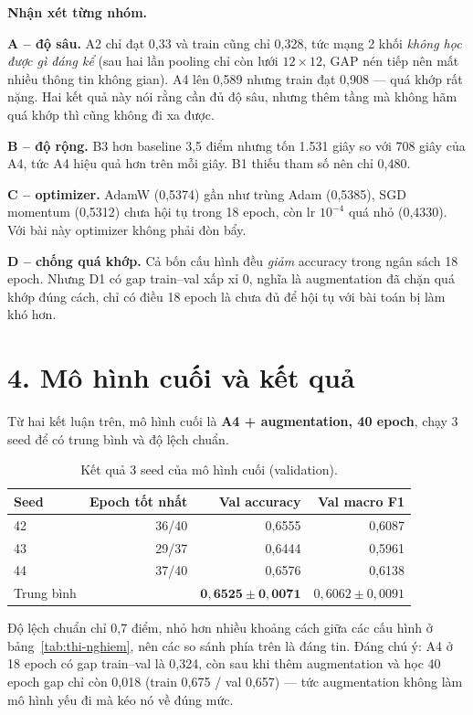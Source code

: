 \documentclass[a4paper,12pt]{article}
\begin{document}
\textbf{Nhận xét từng nhóm.}

\textbf{A -- độ sâu.} A2 chỉ đạt 0,33 và train cũng chỉ 0,328, tức mạng 2 khối \emph{không học
được gì đáng kể} (sau hai lần pooling chỉ còn lưới $12\times12$, GAP nén tiếp nên mất nhiều thông
tin không gian). A4 lên 0,589 nhưng train đạt 0,908 — quá khớp rất nặng. Hai kết quả này nói rằng
cần đủ độ sâu, nhưng thêm tầng mà không hãm quá khớp thì cũng không đi xa được.

\textbf{B -- độ rộng.} B3 hơn baseline 3,5 điểm nhưng tốn 1.531 giây so với 708 giây của A4, tức
A4 hiệu quả hơn trên mỗi giây. B1 thiếu tham số nên chỉ 0,480.

\textbf{C -- optimizer.} AdamW (0,5374) gần như trùng Adam (0,5385), SGD momentum (0,5312) chưa
hội tụ trong 18 epoch, còn lr $10^{-4}$ quá nhỏ (0,4330). Với bài này optimizer không phải đòn bẩy.

\textbf{D -- chống quá khớp.} Cả bốn cấu hình đều \emph{giảm} accuracy trong ngân sách 18 epoch.
Nhưng D1 có gap train--val xấp xỉ 0, nghĩa là augmentation đã chặn quá khớp đúng cách, chỉ có
điều 18 epoch là chưa đủ để hội tụ với bài toán bị làm khó hơn.

\newpage

\section*{4. Mô hình cuối và kết quả}

Từ hai kết luận trên, mô hình cuối là \textbf{A4 + augmentation, 40 epoch}, chạy 3 seed để có
trung bình và độ lệch chuẩn.

\begin{table}[h]
\centering
\caption{Kết quả 3 seed của mô hình cuối (validation).}
\begin{tabular}{lrrr}
\toprule
Seed & Epoch tốt nhất & Val accuracy & Val macro F1 \\
\midrule
42 & 36/40 & 0,6555 & 0,6087 \\
43 & 29/37 & 0,6444 & 0,5961 \\
44 & 37/40 & 0,6576 & 0,6138 \\
\midrule
Trung bình & & $\mathbf{0,6525 \pm 0,0071}$ & $0,6062 \pm 0,0091$ \\
\bottomrule
\end{tabular}
\end{table}

Độ lệch chuẩn chỉ 0,7 điểm, nhỏ hơn nhiều khoảng cách giữa các cấu hình ở bảng~\ref{tab:thi-nghiem},
nên các so sánh phía trên là đáng tin. Đáng chú ý: A4 ở 18 epoch có gap train--val là 0,324, còn
sau khi thêm augmentation và học 40 epoch gap chỉ còn 0,018 (train 0,675 / val 0,657) — tức
augmentation không làm mô hình yếu đi mà kéo nó về đúng mức.
\end{document}
